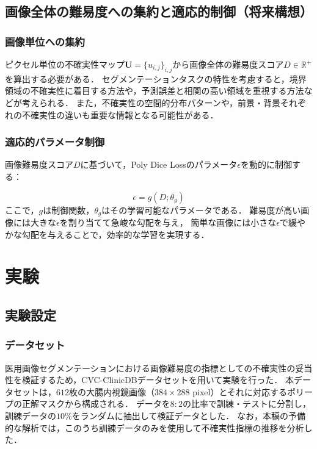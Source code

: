 \documentclass[10pt, a4paper, twocolumn]{jarticle}
\begin{document}
\subsection{画像全体の難易度への集約と適応的制御（将来構想）}

\subsubsection{画像単位への集約}
ピクセル単位の不確実性マップ$\mathbf{U} = \{u_{i,j}\}_{i,j}$から画像全体の難易度スコア$D \in \mathbb{R}^+$を算出する必要がある．
セグメンテーションタスクの特性を考慮すると，境界領域の不確実性に着目する方法や，予測誤差と相関の高い領域を重視する方法などが考えられる．
また，不確実性の空間的分布パターンや，前景・背景それぞれの不確実性の違いも重要な情報となる可能性がある．

\subsubsection{適応的パラメータ制御}
画像難易度スコア$D$に基づいて，Poly Dice Lossのパラメータ$\epsilon$を動的に制御する：

\begin{equation}
  \epsilon = g(D; \theta_g)
\end{equation}
ここで，$g$は制御関数，$\theta_g$はその学習可能なパラメータである．
難易度が高い画像には大きな$\epsilon$を割り当てて急峻な勾配を与え，
簡単な画像には小さな$\epsilon$で緩やかな勾配を与えることで，効率的な学習を実現する．

\section{実験}
\subsection{実験設定}
\subsubsection{データセット}
医用画像セグメンテーションにおける画像難易度の指標としての不確実性の妥当性を検証するため，CVC-ClinicDB\cite{BERNAL201599}データセットを用いて実験を行った．
本データセットは，$612$枚の大腸内視鏡画像（$384 \times 288$ pixel）とそれに対応するポリープの正解マスクから構成される．
データを$8:2$の比率で訓練・テストに分割し，訓練データの$10 \%$をランダムに抽出して検証データとした．
なお，本稿の予備的な解析では，このうち訓練データのみを使用して不確実性指標の推移を分析した．
\end{document}
